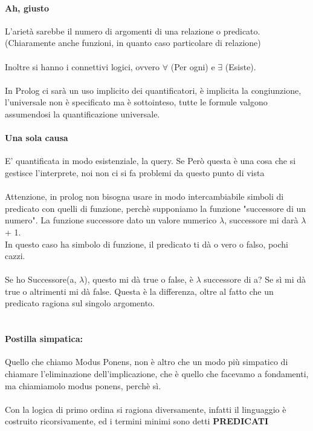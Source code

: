 \documentclass[12pt, a4paper, openany, oneside]{book}
\begin{document}
\paragraph{Ah, giusto} L'arietà sarebbe il numero di argomenti di una relazione o
predicato. (Chiaramente anche funzioni, in quanto caso particolare di relazione)
\\ \\
Inoltre si hanno i connettivi logici, ovvero $\forall$ (Per ogni) e $\exists$ 
(Esiste). \\ \\
In Prolog ci sarà un uso implicito dei quantificatori, è implicita la 
congiunzione, l'universale non è specificato ma è sottointeso, tutte le formule 
valgono assumendosi la quantificazione universale. 
\paragraph{Una sola causa} E' quantificata in modo esistenziale, la query. Se 
Però questa è una cosa che si gestisce l'interprete, noi non ci si fa problemi 
da questo punto di vista
\\ \\
Attenzione, in prolog non bisogna usare in modo intercambiabile simboli di 
predicato con quelli di funzione, perchè supponiamo la funzione "successore di 
un numero". La funzione successore dato un valore numerico $\lambda$, successore
mi darà $\lambda$ + 1.
\\ 
In questo caso ha simbolo di funzione, il predicato ti dà o vero o falso, pochi 
cazzi.
\\ \\
Se ho Successore(a, $\lambda$), questo mi dà true o false, è $\lambda$ successore
di a? Se sì mi dà true o altrimenti mi dà false. Questa è la differenza, oltre al
fatto che un predicato ragiona sul singolo argomento.
\\ \\
\paragraph{Postilla simpatica: }Quello che chiamo Modus Ponens, non è altro che 
un modo più simpatico di chiamare l'eliminazione dell'implicazione, che è quello
che facevamo a fondamenti, ma chiamiamolo modus ponens, perchè sì. 
\\ \\
Con la logica di primo ordina si ragiona diversamente, infatti il linguaggio
è costruito ricorsivamente, ed i termini minimi sono detti \textbf{PREDICATI}
\end{document}
